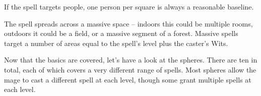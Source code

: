 \begin{multicols}{2}
If the spell targets people, one person per square is always a reasonable baseline.


The spell spreads across a massive space -- indoors this could be multiple rooms, outdoors it could be a field, or a massive segment of a forest.
Massive spells target a number of areas equal to the spell's level plus the caster's Wits.

\vspace{.3in} 

\noindent Now that the basics are covered, let's have a look at the \glspl{sphere}. There are ten in total, each of which covers a very different range of spells. Most \glspl{sphere} allow the mage to cast a different spell at each level, though some grant multiple spells at each level.

\end{multicols}


